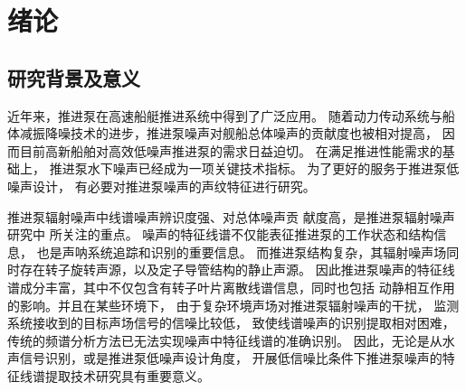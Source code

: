 \chapter{绪论}

\section{研究背景及意义}
近年来，推进泵在高速船艇推进系统中得到了广泛应用。
随着动力传动系统与船体减振降噪技术的进步，推进泵噪声对舰船总体噪声的贡献度也被相对提高，
因而目前高新船舶对高效低噪声推进泵的需求日益迫切\cite{ozdenUnderwaterRadiatedNoise2016}。
在满足推进性能需求的基础上，
推进泵水下噪声已经成为一项关键技术指标。
为了更好的服务于推进泵低噪声设计，
有必要对推进泵噪声的声纹特征进行研究。

\begin{comment}
推进泵噪声机理较为复杂，抛开空化噪声不谈仅从流致噪声角度考虑，其频谱已呈现宽带与线谱交叠的形貌。
推进泵内非定常流动与水力部件相互作用产生的流致激励是重要的噪声激励源，
推进泵声信号中蕴含着丰富的流致激励源信息，流致激励源特征能反映推进泵的运行状态和结构信息。
当推进泵内流动发生显著改变时，其声信号的低频声纹理特性也会发生变化。
无论是从特征声源信号识别，或是发展噪声能量主动控制技术角度，
构建推进泵流致激励源识别的有效方法，建立流致激励源特征与声信号之间的联系都尤为重要。
\end{comment}


推进泵辐射噪声中线谱噪声辨识度强、对总体噪声贡
献度高，是推进泵辐射噪声研究中
所关注的重点。
噪声的特征线谱不仅能表征推进泵的工作状态和结构信息，
也是声呐系统追踪和识别的重要信息。
而推进泵结构复杂，其辐射噪声场同时存在转子旋转声源，以及定子导管结构的静止声源。
因此推进泵噪声的特征线谱成分丰富，其中不仅包含有转子叶片离散线谱信息，同时也包括
动静相互作用的影响。并且在某些环境下，
由于复杂环境声场对推进泵辐射噪声的干扰，
监测系统接收到的目标声场信号的信噪比较低，
致使线谱噪声的识别提取相对困难，
传统的频谱分析方法已无法实现噪声中特征线谱的准确识别。
因此，无论是从水声信号识别，或是推进泵低噪声设计角度，
开展低信噪比条件下推进泵噪声的特征线谱提取技术研究具有重要意义。

